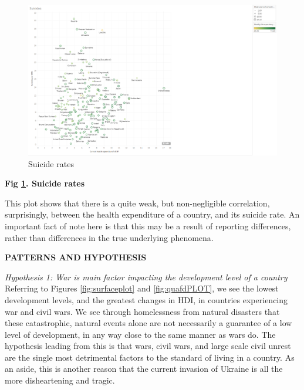 \documentclass[ 10pt ]{fphw}
\begin{document}
\begin{center}
\begin{figure}[H]
    \centering
	\includegraphics[width=0.75\columnwidth]{suicides.PNG} 
	\caption{Suicide rates}
	\label{fig:suicide}
	\end{figure}
\end{center}

\textbf{Fig \ref{fig:suicide}. Suicide rates} 

\vspace{0.25cm}
This plot shows that there is a quite weak, but non-negligible correlation, surprisingly, between the health expenditure of a country, and its suicide rate. An important fact of note here is that this may be a result of reporting differences, rather than differences in the true underlying phenomena. 

\vspace{0.8cm}

\textbf{PATTERNS AND HYPOTHESIS} 

\vspace{0.8cm}

\textit{Hypothesis 1: War is main factor impacting the development level of a country}
Referring to Figures \ref{fig:surfaceplot} and \ref{fig:quafdPLOT}, we see the lowest development levels, and the greatest changes in HDI, in countries experiencing war and civil wars. We see through homelessness from natural disasters that these catastrophic, natural events alone are not necessarily a guarantee of a low level of development, in any way close to the same manner as wars do. The hypothesis leading from this is that wars, civil wars, and large scale civil unrest are the single most detrimental factors to the standard of living in a country. As an aside, this is another reason that the current invasion of Ukraine is all the more disheartening and tragic.
\end{document}
